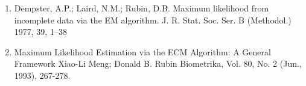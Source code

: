 \documentclass[11pt]{article}
\begin{document}
\clearpage
\begin{center}
\fontsize{16}{20}\selectfont {}
\end{center}
\begin{center}
\fontsize{14}{18}\selectfont {}
\end{center}
\begin{center}
\fontsize{14}{18}\selectfont {}
\end{center}
\begin{center}
\fontsize{14}{18}\selectfont {}
\end{center}
\begin{center}
\fontsize{14}{18}\selectfont {}
\end{center}
\clearpage
\begin{center}
\fontsize{16}{20}\selectfont {}
\end{center}
\begin{enumerate}
\item
Dempster, A.P.; Laird, N.M.; Rubin, D.B. Maximum likelihood from incomplete data via the EM algorithm. J. R. Stat. Soc. Ser. B
(Methodol.) 1977, 39, 1–38
\item
Maximum Likelihood Estimation via the ECM Algorithm: A General Framework Xiao-Li Meng; Donald B. Rubin Biometrika, Vol. 80, No. 2 (Jun., 1993), 267-278.
\end{enumerate}
\end{document}
